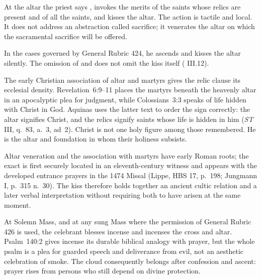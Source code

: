 
At the altar the priest says , invokes the merits of the saints whose relics are present and of all the saints, and kisses the altar. The action is tactile and local. It does not address an abstraction called sacrifice; it venerates the altar on which the sacramental sacrifice will be offered.

In the cases governed by General Rubric 424, he ascends and kisses the altar silently. The omission of  and  does not omit the kiss itself ( III.12).

The early Christian association of altar and martyrs gives the relic clause its ecclesial density. Revelation~6:9--11 places the martyrs beneath the heavenly altar in an apocalyptic plea for judgment, while Colossians~3:3 speaks of life hidden with Christ in God. Aquinas uses the latter text to order the sign correctly: the altar signifies Christ, and the relics signify saints whose life is hidden in him (\emph{ST} III, q.~83, a.~3, ad~2). Christ is not one holy figure among those remembered. He is the altar and foundation in whom their holiness subsists.

Altar veneration and the association with martyrs have early Roman roots; the exact  is first securely located in an eleventh-century witness and appears with the developed entrance prayers in the 1474 Missal (Lippe, HBS 17, p.~198; Jungmann I, p.~315 n.~30). The kiss therefore holds together an ancient cultic relation and a later verbal interpretation without requiring both to have arisen at the same moment.


At Solemn Mass, and at any sung Mass where the permission of General Rubric 426 is used, the celebrant blesses incense and incenses the cross and altar. Psalm~140:2 gives incense its durable biblical analogy with prayer, but the whole psalm is a plea for guarded speech and deliverance from evil, not an aesthetic celebration of smoke. The cloud consequently belongs after confession and ascent: prayer rises from persons who still depend on divine protection.

